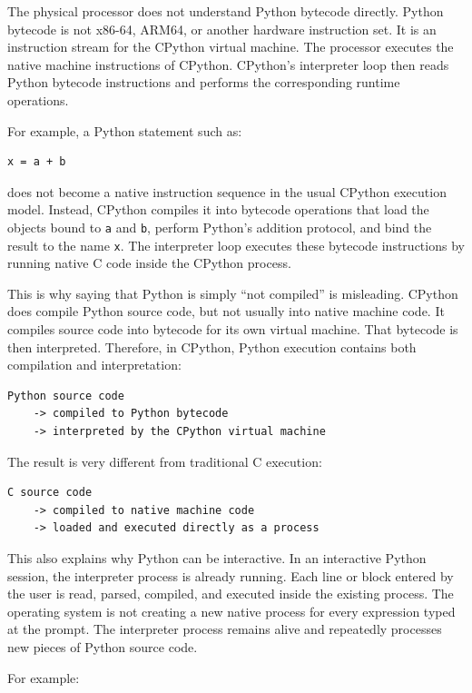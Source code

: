 The physical processor does not understand Python bytecode directly. Python bytecode is not x86-64, ARM64, or another hardware instruction set. It is an instruction stream for the CPython virtual machine. The processor executes the native machine instructions of CPython. CPython's interpreter loop then reads Python bytecode instructions and performs the corresponding runtime operations.

For example, a Python statement such as:

\begin{verbatim}
x = a + b
\end{verbatim}

does not become a native instruction sequence in the usual CPython execution model. Instead, CPython compiles it into bytecode operations that load the objects bound to \texttt{a} and \texttt{b}, perform Python's addition protocol, and bind the result to the name \texttt{x}. The interpreter loop executes these bytecode instructions by running native C code inside the CPython process.

This is why saying that Python is simply ``not compiled'' is misleading. CPython does compile Python source code, but not usually into native machine code. It compiles source code into bytecode for its own virtual machine. That bytecode is then interpreted. Therefore, in CPython, Python execution contains both compilation and interpretation:

\begin{verbatim}
Python source code
    -> compiled to Python bytecode
    -> interpreted by the CPython virtual machine
\end{verbatim}

The result is very different from traditional C execution:

\begin{verbatim}
C source code
    -> compiled to native machine code
    -> loaded and executed directly as a process
\end{verbatim}

This also explains why Python can be interactive. In an interactive Python session, the interpreter process is already running. Each line or block entered by the user is read, parsed, compiled, and executed inside the existing process. The operating system is not creating a new native process for every expression typed at the prompt. The interpreter process remains alive and repeatedly processes new pieces of Python source code.

For example:

